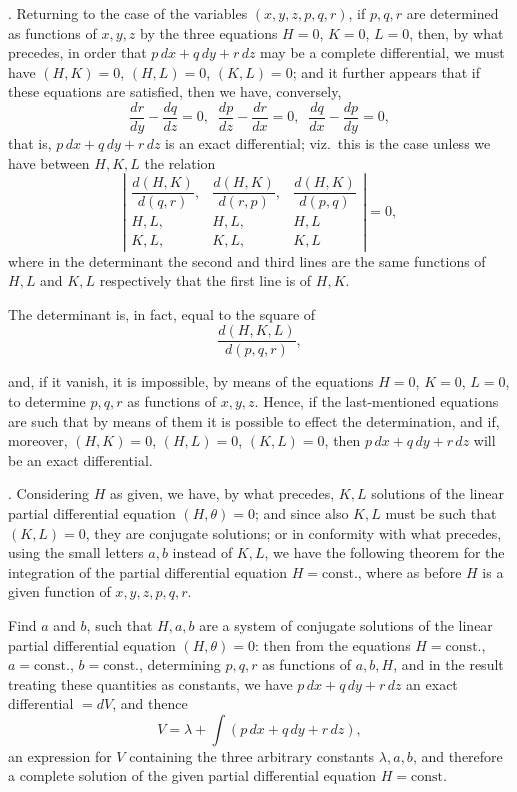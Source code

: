 \documentclass[11pt,a4paper]{article}
\begin{document}
\medskip

. Returning to the case of the variables $(x, y, z, p, q, r)$, if $p, q, r$ are determined as functions of $x, y, z$ by the three equations $H = 0$, $K = 0$, $L = 0$, then, by what precedes, in order that $p\,dx + q\,dy + r\,dz$ may be a complete differential, we must have $(H, K) = 0$, $(H, L) = 0$, $(K, L) = 0$; and it further appears that if these equations are satisfied, then we have, conversely,
\[
\frac{dr}{dy} - \frac{dq}{dz} = 0, \;\; \frac{dp}{dz} - \frac{dr}{dx} = 0, \;\; \frac{dq}{dx} - \frac{dp}{dy} = 0,
\]
that is, $p\,dx + q\,dy + r\,dz$ is an exact differential; viz.\ this is the case unless we have between $H, K, L$ the relation
\[
\left|
\begin{array}{ccc}
\dfrac{d(H, K)}{d(q, r)}, & \dfrac{d(H, K)}{d(r, p)}, & \dfrac{d(H, K)}{d(p, q)} \\[6pt]
H, L, & H, L, & H, L \\
K, L, & K, L, & K, L
\end{array}
\right| = 0,
\]
where in the determinant the second and third lines are the same functions of $H, L$ and $K, L$ respectively that the first line is of $H, K$.

The determinant is, in fact, equal to the square of
\[
\frac{d(H, K, L)}{d(p, q, r)},
\]

\newpage


and, if it vanish, it is impossible, by means of the equations $H = 0$, $K = 0$, $L = 0$, to determine $p, q, r$ as functions of $x, y, z$. Hence, if the last-mentioned equations are such that by means of them it is possible to effect the determination, and if, moreover, $(H, K) = 0$, $(H, L) = 0$, $(K, L) = 0$, then $p\,dx + q\,dy + r\,dz$ will be an exact differential.

\medskip

. Considering $H$ as given, we have, by what precedes, $K, L$ solutions of the linear partial differential equation $(H, \theta) = 0$; and since also $K, L$ must be such that $(K, L) = 0$, they are conjugate solutions; or in conformity with what precedes, using the small letters $a, b$ instead of $K, L$, we have the following theorem for the integration of the partial differential equation $H = \text{const.}$, where as before $H$ is a given function of $x, y, z, p, q, r$.

Find $a$ and $b$, such that $H, a, b$ are a system of conjugate solutions of the linear partial differential equation $(H, \theta) = 0$: then from the equations $H = \text{const.}$, $a = \text{const.}$, $b = \text{const.}$, determining $p, q, r$ as functions of $a, b, H$, and in the result treating these quantities as constants, we have $p\,dx + q\,dy + r\,dz$ an exact differential $= dV$, and thence
\[
V = \lambda + \int (p\,dx + q\,dy + r\,dz),
\]
an expression for $V$ containing the three arbitrary constants $\lambda, a, b$, and therefore a complete solution of the given partial differential equation $H = \text{const.}$
\end{document}
